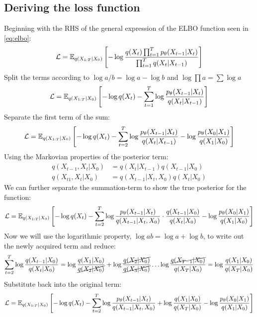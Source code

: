 \subsection{Deriving the loss function} \label{ap:elbo}

Beginning with the RHS of the general expression of the ELBO function seen in \autoref{eq:elbo}: 
\begin{equation}
    \mathcal{L}=\mathbb{E}_{q(X_{1:T}|X_0)} \left[ -\log \frac{q(X_t) \prod_{t=1}^T p_{\theta} (X_{t-1}|X_t)}{\prod_{t=1}^T q(X_t|X_{t-1})} \right]
\end{equation}
Split the terms according to $\log a/b = \log a - \log b$ and $\log \prod a = \sum \log a$
\begin{equation}
    \mathcal{L}=\mathbb{E}_{q(X_{1:T}|X_0)} \left[ -\log q(X_t) -\sum_{t=1}^T \log \frac{ p_{\theta} (X_{t-1}|X_t)}{ q(X_t|X_{t-1})} \right]
\end{equation}
Separate the first term of the sum:
\begin{equation}
    \mathcal{L}=\mathbb{E}_{q(X_{1:T}|X_0)} \left[ -\log q(X_t) -\sum_{t=2}^T \log \frac{ p_{\theta} (X_{t-1}|X_t)}{ q(X_t|X_{t-1})} - \log \frac{ p_{\theta} (X_{0}|X_1)}{ q(X_1|X_{0})} \right]
\end{equation}
Using the Markovian properties of the posterior term: 
\begin{align}
    q(X_{t-1}, X_t|X_0) &= q(X_t|X_{t-1}) q(X_{t-1}|X_0) \\
    q(X_{t1}, X_t|X_0) &= q(X_{t-1}|X_t, X_0) q(X_{t}|X_0)
\end{align}
We can further separate the summation-term to show the true posterior for the function:
\begin{equation}
    \mathcal{L}=\mathbb{E}_{q(X_{1:T}|X_0)} \left[ -\log q(X_t) -\sum_{t=2}^T \log \frac{ p_{\theta} (X_{t-1}|X_t)}{ q(X_{t-1}|X_{t}, X_0)} \cdot \frac{q(X_{t-1}|X_0)}{q(X_t|X_0)} - \log \frac{ p_{\theta} (X_{0}|X_1)}{ q(X_1|X_{0})} \right]
\end{equation}
Now we will use the logarithmic property, $\log ab = \log a + \log b$, to write out the newly acquired term and reduce:
\begin{equation}
    \sum_{t=2}^T \log \frac{q(X_{t-1}|X_0)}{q(X_t|X_0)} = \log \frac{q(X_{1}|X_0)}{\cancel{q(X_2|X_0)}} + \log \frac{\cancel{q(X_{2}|X_0)}}{\cancel{q(X_3|X_0)}} \dots \log \frac{ \cancel{q(X_{T-1}|X_0)}}{q(X_T|X_0)} = \log \frac{q(X_1|X_0)}{q(X_T|X_0)}
\end{equation}
Substitute back into the original term:
\begin{equation}
    \mathcal{L}=\mathbb{E}_{q(X_{1:T}|X_0)} \left[ -\log q(X_t) -\sum_{t=2}^T \log \frac{ p_{\theta} (X_{t-1}|X_t)}{ q(X_{t-1}|X_{t}, X_0)} + \log \frac{q(X_1|X_0)}{q(X_T|X_0)} - \log \frac{ p_{\theta} (X_{0}|X_1)}{ q(X_1|X_{0})} \right]
\end{equation}
